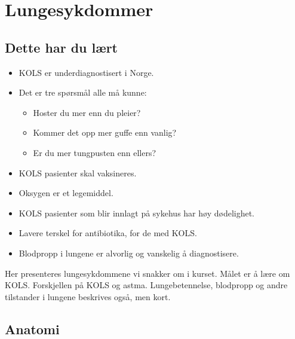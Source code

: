 \chapter{Lungesykdommer}
		\section{Dette har du lært}
			\begin{itemize}
				\item KOLS er underdiagnostisert i Norge.\\
				\item Det er tre spørsmål alle må kunne\cite{anthonisen}:\\
					\begin{itemize}
						\item Hoster du mer enn du pleier?\\
						\item Kommer det opp mer guffe enn vanlig?\\
						\item Er du mer tungpusten enn ellers?\\
					\end{itemize}
				\item KOLS pasienter skal vaksineres.\\
				\item Oksygen er et legemiddel.\\
				\item KOLS pasienter som blir innlagt på sykehus har høy dødelighet.\\
				\item Lavere terskel for antibiotika, for de med KOLS.\\
				\item Blodpropp i lungene er alvorlig og vanskelig å diagnostisere.\\
			\end{itemize}Her presenteres lungesykdommene vi snakker om i kurset. Målet er å lære om KOLS. Forskjellen på KOLS og astma. Lungebetennelse, blodpropp og andre tilstander i lungene beskrives også, men kort.
		\section{Anatomi}
